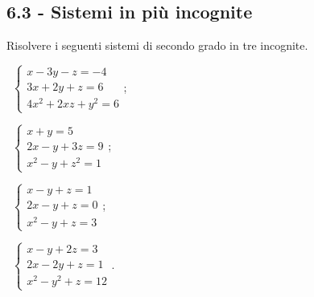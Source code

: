 \subsection*{6.3 - Sistemi in più incognite}

\begin{esercizio}
 \label{ese:6.20}
Risolvere i seguenti sistemi di secondo grado in tre incognite.
\begin{multicols}{2}
 \begin{enumeratea}
 \item~$\left\{\begin{array}{l}x-3y-z=-4\\3x+2y+z=6\\4x^2+2xz+y^2=6\end{array}\right.$;
 \item~$\left\{\begin{array}{l}x+y=5\\2x-y+3z=9\\x^2-y+z^2=1\end{array}\right.$;
 \item~$\left\{\begin{array}{l}x-y+z=1\\2x-y+z=0\\x^2-y+z=3\end{array}\right.$;
 \item~$\left\{\begin{array}{l}x-y+2z=3\\2x-2y+z=1\\x^2-y^2+z=12\end{array}\right.$.
 \end{enumeratea}
 \end{multicols}
\end{esercizio}

